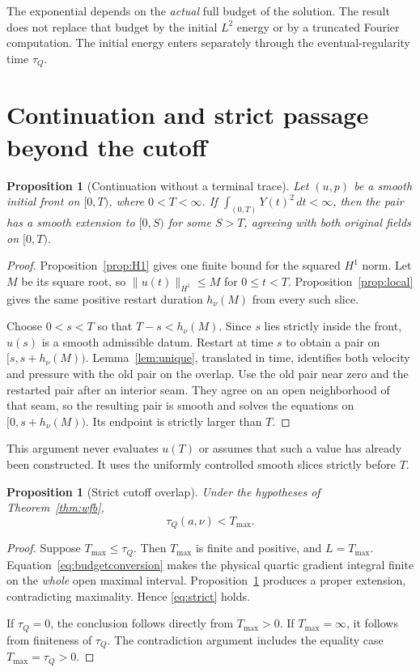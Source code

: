 \documentclass[11pt,a4paper]{article}
\numberwithin{equation}{section}
\theoremstyle{plain}
\newtheorem{proposition}[theorem]{Proposition}
\theoremstyle{definition}
\theoremstyle{remark}
\newcommand{\norm}[2]{\lVert #1\rVert_{#2}}
\newcommand{\Tmax}{T_{\max}}
\newcommand{\tq}{\tau_Q}
\begin{document}
The exponential depends on the \emph{actual} full budget of the solution.
The result does not replace that budget by the initial $L^2$ energy or by
a truncated Fourier computation. The initial energy enters separately
through the eventual-regularity time $\tq$.

\section{Continuation and strict passage beyond the cutoff}\label{sec:continue}
\begin{proposition}[Continuation without a terminal trace]\label{prop:continue}
Let $(u,p)$ be a smooth initial front on $[0,T)$, where $0<T<\infty$.
If $\int_{(0,T)}Y(t)^2\,dt<\infty$, then the pair has a smooth extension
to $[0,S)$ for some $S>T$, agreeing with both original fields on $[0,T)$.
\end{proposition}
\begin{proof}
Proposition~\ref{prop:H1} gives one finite bound for the squared $H^1$
norm. Let $M$ be its square root, so $\norm{u(t)}{H^1}\le M$ for
$0\le t<T$. Proposition~\ref{prop:local} gives the same positive
restart duration $h_\nu(M)$ from every such slice.

Choose $0<s<T$ so that $T-s<h_\nu(M)$. Since $s$ lies strictly inside the
front, $u(s)$ is a smooth admissible datum. Restart at time $s$ to obtain
a pair on $[s,s+h_\nu(M))$. Lemma~\ref{lem:unique}, translated in time,
identifies both velocity and pressure with the old pair on the overlap.
Use the old pair near zero and the restarted pair after an interior seam.
They agree on an open neighborhood of that seam, so the resulting pair
is smooth and solves the equations on $[0,s+h_\nu(M))$. Its endpoint is
strictly larger than $T$.
\end{proof}

This argument never evaluates $u(T)$ or assumes that such a value has
already been constructed. It uses the uniformly controlled smooth slices
strictly before $T$.

\begin{proposition}[Strict cutoff overlap]\label{prop:strict}
Under the hypotheses of Theorem~\ref{thm:wfb},
\begin{equation}\label{eq:strict}
 \tq(a,\nu)<\Tmax.
\end{equation}
\end{proposition}
\begin{proof}
Suppose $\Tmax\le\tq$. Then $\Tmax$ is finite and positive, and
$L=\Tmax$. Equation~\eqref{eq:budgetconversion} makes the physical
quartic gradient integral finite on the \emph{whole} open maximal
interval. Proposition~\ref{prop:continue} produces a proper extension,
contradicting maximality. Hence \eqref{eq:strict} holds.

If $\tq=0$, the conclusion follows directly from $\Tmax>0$.
If $\Tmax=\infty$, it follows from finiteness of $\tq$.
The contradiction argument includes the equality case $\Tmax=\tq>0$.
\end{proof}
\end{document}
